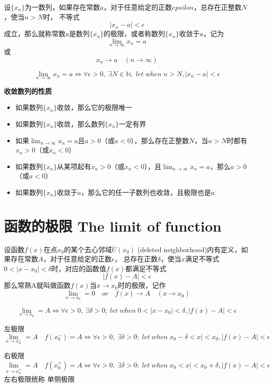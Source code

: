 \documentclass[UTF8]{ctexart}
\begin{document}
\bigskip

设$\{x_n\}$为一数列，如果存在常数$a$，对于任意给定的正数$epsilon$，总存在正整数$N$，使当$n>N$时，
不等式
\[
  |x_n-a|<\epsilon
\]
成立，那么就称常数$a$是数列$\{x_n\}$的极限，或者称数列$\{x_n\}$收敛于$a$，记为
\[
  \lim_{n\to\infty}x_n=a
\]
或
\[
  x_n \to a \quad (n\to\infty)
\]

\[
  \lim_{n\to\infty}x_n=a\iff\forall\epsilon>0,\; \exists N\in \mathbb{N},\; let\; when\; n>N,|x_n-a|<\epsilon
\]

\bigskip

\textbf{收敛数列的性质}
\begin{itemize}
\item 如果数列$\{x_n\}$收敛，那么它的极限唯一
\item 如果数列$\{x_n\}$收敛，那么数列$\{x_n\}$一定有界
\item 如果$\lim_{n\to\infty}x_n=a$且$a>0$（或$a<0$），那么存在正整数$N$，当$n>N$时都有$x_n>0$（或$x_n<0$）
\item 如果数列$\{x_n\}$从某项起有$x_n>0$（或$x_n<0$），且$\lim_{n\to\infty}x_n=a$，那么$a>0$（或$a<0$）
\item 如果数列$\{x_n\}$收敛于$a$，那么它的任一子数列也收敛，且极限也是$a$
\end{itemize}
\bigskip
\bigskip
\section*{函数的极限 The limit of function}

\bigskip

设函数$f(x)$在点$x_0$的某个去心邻域$\mathring{U}(x_0)$ (deleted neighborhood)内有定义，如果存在常数$A$，对于任意给定的正数$\epsilon$，
总存在正数$\delta$，使当$x$满足不等式$0<|x-x_0|<\delta$时，对应的函数值$f(x)$都满足不等式
\[
  |f(x)-A|<\epsilon
\]
那么常熟A就叫做函数$f(x)$当$x\to x_0$时的极限，记作
\[
  \lim_{x\to x_0}=0 \quad or \quad f(x)\to A \quad (x\to x_0)
\]

\[
  \lim_{x\to x_0}=A\iff\forall\epsilon>0,\;\exists\delta>0;\;let\;when\;0<|x-x_0|<\delta,|f(x)-A|<\epsilon
\]

左极限
\[
  \lim_{x\to x_0^-}=A\quad f(x_0^-)=A\iff\forall\epsilon>0,\;\exists\delta>0;\;let\;when\;x_0-\delta<x|<x_0,|f(x)-A|<\epsilon
\]

右极限
\[
  \lim_{x\to x_0^+}=A\quad f(x_0^+)=A\iff\forall\epsilon>0,\;\exists\delta>0;\;let\;when\;x_0<x|<x_0+\delta,|f(x)-A|<\epsilon
\]
左右极限统称 单侧极限

\bigskip
\end{document}
